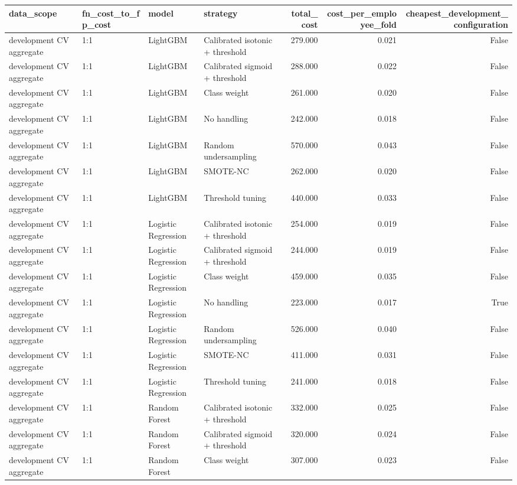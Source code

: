 \begin{tabular}{llllrrr}
\toprule
data_scope & fn_cost_to_fp_cost & model & strategy & total_cost & cost_per_employee_fold & cheapest_development_configuration \\
\midrule
development CV aggregate & 1:1 & LightGBM & Calibrated isotonic + threshold & 279.000 & 0.021 & False \\
development CV aggregate & 1:1 & LightGBM & Calibrated sigmoid + threshold & 288.000 & 0.022 & False \\
development CV aggregate & 1:1 & LightGBM & Class weight & 261.000 & 0.020 & False \\
development CV aggregate & 1:1 & LightGBM & No handling & 242.000 & 0.018 & False \\
development CV aggregate & 1:1 & LightGBM & Random undersampling & 570.000 & 0.043 & False \\
development CV aggregate & 1:1 & LightGBM & SMOTE-NC & 262.000 & 0.020 & False \\
development CV aggregate & 1:1 & LightGBM & Threshold tuning & 440.000 & 0.033 & False \\
development CV aggregate & 1:1 & Logistic Regression & Calibrated isotonic + threshold & 254.000 & 0.019 & False \\
development CV aggregate & 1:1 & Logistic Regression & Calibrated sigmoid + threshold & 244.000 & 0.019 & False \\
development CV aggregate & 1:1 & Logistic Regression & Class weight & 459.000 & 0.035 & False \\
development CV aggregate & 1:1 & Logistic Regression & No handling & 223.000 & 0.017 & True \\
development CV aggregate & 1:1 & Logistic Regression & Random undersampling & 526.000 & 0.040 & False \\
development CV aggregate & 1:1 & Logistic Regression & SMOTE-NC & 411.000 & 0.031 & False \\
development CV aggregate & 1:1 & Logistic Regression & Threshold tuning & 241.000 & 0.018 & False \\
development CV aggregate & 1:1 & Random Forest & Calibrated isotonic + threshold & 332.000 & 0.025 & False \\
development CV aggregate & 1:1 & Random Forest & Calibrated sigmoid + threshold & 320.000 & 0.024 & False \\
development CV aggregate & 1:1 & Random Forest & Class weight & 307.000 & 0.023 & False \\

\end{tabular}

